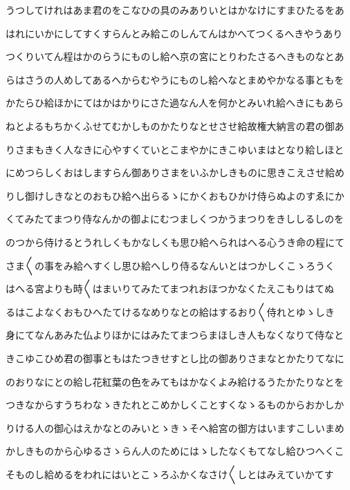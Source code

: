 \documentclass[a4paper,11pt,landscape]{ltjtarticle}
\begin{document}
\par\medskip
うつしてけれはあま君のをこなひの具のみありいとはかなけにすまひたるをあ
\par\medskip
はれにいかにしてすくすらんとみ給このしんてんはかへてつくるへきやうあり
\par\medskip
つくりいてん程はかのらうにものし給へ京の宮にとりわたさるへきものなとあ
\par\medskip
らはさうの人めしてあるへからむやうにものし給へなとまめやかなる事ともを
\par\medskip
かたらひ給ほかにてはかはかりにさた過なん人を何かとみいれ給へきにもあら
\par\medskip
ねとよるもちかくふせてむかしものかたりなとせさせ給故権大納言の君の御あ
\par\medskip
りさまもきく人なきに心やすくていとこまやかにきこゆいまはとなり給しほと
\par\medskip
にめつらしくおはしますらん御ありさまをいふかしきものに思きこえさせ給め
\par\medskip
りし御けしきなとのおもひ給へ出らるゝにかくおもひかけ侍らぬよのすゑにか
\par\medskip
くてみたてまつり侍なんかの御よにむつましくつかうまつりをきししるしのを
\par\medskip
のつから侍けるとうれしくもかなしくも思ひ給へられはへる心うき命の程にて
\par\medskip
さま〱の事をみ給へすくし思ひ給へしり侍るなんいとはつかしくこゝろうく
\par\medskip
はへる宮よりも時〱はまいりてみたてまつれおほつかなくたえこもりはてぬ
\par\medskip
るはこよなくおもひへたてけるなめりなとの給はするおり〱侍れとゆゝしき
\par\medskip
身にてなんあみた仏よりほかにはみたてまつらまほしき人もなくなりて侍なと
\par\medskip
きこゆこひめ君の御事ともはたつきせすとし比の御ありさまなとかたりてなに
\par\medskip
のおりなにとの給し花紅葉の色をみてもはかなくよみ給けるうたかたりなとを
\par\medskip
つきなからすうちわなゝきたれとこめかしくことすくなゝるものからおかしか
\par\medskip
りける人の御心はえかなとのみいとゝきゝそへ給宮の御方はいますこしいまめ
\par\medskip
かしきものから心ゆるさゝらん人のためにはゝしたなくもてなし給ひつへくこ
\par\medskip
そものし給めるをわれにはいとこゝろふかくなさけ〱しとはみえていかてす
\par\medskip
\end{document}
